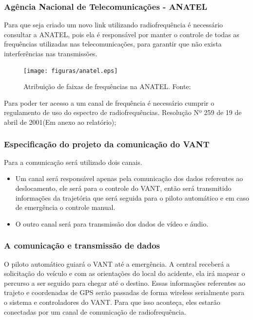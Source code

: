 \subsubsection{Agência Nacional de Telecomunicações - ANATEL}

Para que seja criado um novo link utilizando radiofrequência é necessário consultar a ANATEL, pois ela é responsável por manter o controle de todas as frequências utilizadas nas telecomunicações, para garantir que não exista interferências nas transmissões.

\begin{figure}[H]
	\centering
	  \texttt{[image: figuras/anatel.eps]}
	\caption{Atribuição de faixas de frequências na ANATEL. Fonte: \cite{anatel}}
	\label{fig:tabela}
\end{figure}


Para poder ter acesso a um canal de frequência é necessário cumprir o regulamento de uso do espectro de radiofrequências. Resolução Nº 259 de 19 de abril de 2001(Em anexo ao relatório);

\subsubsection{Especificação do projeto da comunicação do VANT}

Para a comunicação será utilizado dois canais.

\begin{itemize}
	\item Um canal será responsável apenas pela comunicação dos dados referentes ao deslocamento, ele será para o controle do VANT, então será transmitido informações da trajetória que será seguida para o piloto automático e em caso de emergência o controle manual.
	\item O outro canal será para transmissão dos dados de vídeo e áudio.
\end{itemize}

\subsubsection{A comunicação e transmissão de dados }

O piloto automático guiará o VANT até a emergência. A central receberá a solicitação do veículo e com as orientações do local do acidente, ela irá mapear o percurso a ser seguido para chegar até o destino.  Essas informações referentes ao trajeto e coordenadas de GPS serão passadas de forma wireless serialmente para o sistema e controladores do VANT. Para que isso aconteça, eles estarão conectadas por um canal de comunicação de radiofrequência.

